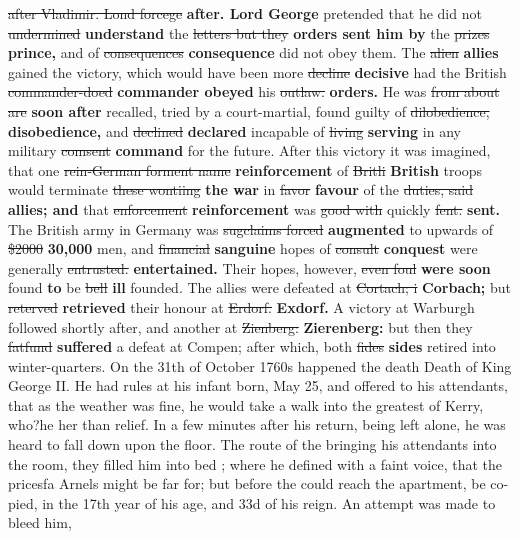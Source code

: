 \documentclass[10pt]{article}
\begin{document}
\sout{after Vladimir. Lond forcege} \textbf{after. Lord George} pretended that he did not \sout{undermined} \textbf{understand} the \sout{letters but they} \textbf{orders sent him by} the \sout{prizes} \textbf{prince,} and of \sout{consequences} \textbf{consequence} did not obey them. The \sout{alien} \textbf{allies} gained the victory, which would have been more \sout{decline} \textbf{decisive} had the British \sout{commander-doed} \textbf{commander obeyed} his \sout{outlaw.} \textbf{orders.} He was \sout{from about are} \textbf{soon after} recalled, tried by a court-martial, found guilty of \sout{dilobedience,} \textbf{disobedience,} and \sout{declined} \textbf{declared} incapable of \sout{living} \textbf{serving} in any military \sout{comsent} \textbf{command} for the future. After this victory it was imagined, that one \sout{rein-German forment name} \textbf{reinforcement} of \sout{Britli} \textbf{British} troops would terminate \sout{these wontiing} \textbf{the war} in \sout{favor} \textbf{favour} of the \sout{duties, said} \textbf{allies; and} that \sout{enforcement} \textbf{reinforcement} was \sout{good with} quickly \sout{fent.} \textbf{sent.} The British army in Germany was \sout{sugclaims forced} \textbf{augmented} to upwards of \sout{\$2000} \textbf{30,000} men, and \sout{financial} \textbf{sanguine} hopes of \sout{consult} \textbf{conquest} were generally \sout{entrusted.} \textbf{entertained.} Their hopes, however, \sout{even foul} \textbf{were soon} found \textbf{to} be \sout{bell} \textbf{ill} founded. The allies were defeated at \sout{Cortach; i} \textbf{Corbach;} but \sout{reterved} \textbf{retrieved} their honour at \sout{Erdorf.} \textbf{Exdorf.} A victory at Warburgh followed shortly after, and another at \sout{Zienberg:} \textbf{Zierenberg:} but then they \sout{fatfund} \textbf{suffered} a defeat at Compen; after which, both \sout{fides} \textbf{sides} retired into winter-quarters. On the 31th of October 1760s happened the death Death of King George II. He had rules at his infant born, May 25, and offered to his attendants, that as the weather was fine, he would take a walk into the greatest of Kerry, who?he her than relief. In a few minutes after his return, being left alone, he was heard to fall down upon the floor. The route of the bringing his attendants into the room, they filled him into bed ; where he defined with a faint voice, that the pricesfa Arnels might be far for; but before the could reach the apartment, be co-pied, in the 17th year of his age, and 33d of his reign. An attempt was made to bleed him,
\end{document}
